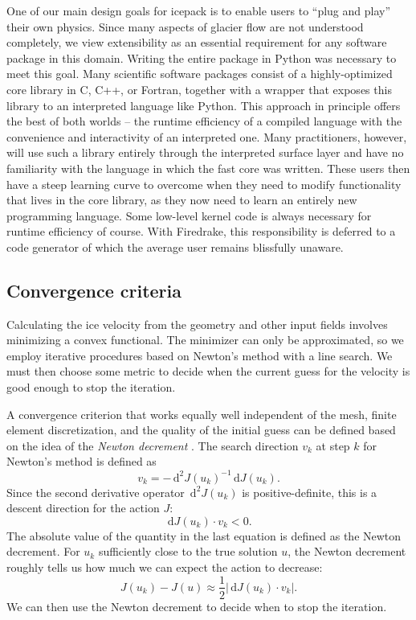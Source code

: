 \documentclass{article}
\theoremstyle{definition}
\theoremstyle{plain}
\newcommand{\ud}{\hspace{2pt}\mathrm{d}}
\begin{document}
One of our main design goals for icepack is to enable users to ``plug and play'' their own physics.
Since many aspects of glacier flow are not understood completely, we view extensibility as an essential requirement for any software package in this domain.
Writing the entire package in Python was necessary to meet this goal.
Many scientific software packages consist of a highly-optimized core library in C, C++, or Fortran, together with a wrapper that exposes this library to an interpreted language like Python.
This approach in principle offers the best of both worlds -- the runtime efficiency of a compiled language with the convenience and interactivity of an interpreted one.
Many practitioners, however, will use such a library entirely through the interpreted surface layer and have no familiarity with the language in which the fast core was written.
These users then have a steep learning curve to overcome when they need to modify functionality that lives in the core library, as they now need to learn an entirely new programming language.
Some low-level kernel code is always necessary for runtime efficiency of course.
With Firedrake, this responsibility is deferred to a code generator of which the average user remains blissfully unaware.


\subsection{Convergence criteria} \label{sec:convergence-criteria}

Calculating the ice velocity from the geometry and other input fields involves minimizing a convex functional.
The minimizer can only be approximated, so we employ iterative procedures based on Newton's method with a line search.
We must then choose some metric to decide when the current guess for the velocity is good enough to stop the iteration.

A convergence criterion that works equally well independent of the mesh, finite element discretization, and the quality of the initial guess can be defined based on the idea of the \emph{Newton decrement} \citep{nocedal2006numerical}.
The search direction $v_k$ at step $k$ for Newton's method is defined as
\begin{equation}
    v_k = -\ud^2J(u_k)^{-1}\ud J(u_k).
\end{equation}
Since the second derivative operator $\ud^2J(u_k)$ is positive-definite, this is a descent direction for the action $J$:
\begin{equation}
    \ud J(u_k)\cdot v_k < 0.
\end{equation}
The absolute value of the quantity in the last equation is defined as the Newton decrement.
For $u_k$ sufficiently close to the true solution $u$, the Newton decrement roughly tells us how much we can expect the action to decrease:
\begin{equation}
    J(u_k) - J(u) \approx \frac{1}{2}|\ud J(u_k)\cdot v_k|.
\end{equation}
We can then use the Newton decrement to decide when to stop the iteration.
\end{document}
